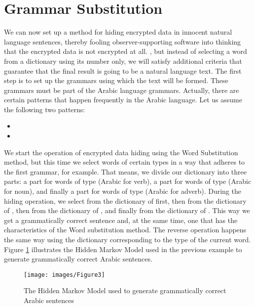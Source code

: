 \documentclass{acm_proc_article-sp}
\begin{document}
\section{Grammar Substitution}\label{Grammar-Substitution}
We can now set up a method for hiding encrypted data in innocent natural language sentences, thereby fooling observer-supporting software into thinking that the encrypted data is not encrypted at all.
, but instead of selecting a word from a dictionary using its number only, we will satisfy additional criteria that guarantee that the final result is going to be a natural language text. The first step is to set up the grammars using which the text will be formed. These grammars must be part of the Arabic language grammars. Actually, there are certain patterns that happen frequently in the Arabic language. Let us assume the following two patterns:
\begin{itemize}
    \item {}
    \item {}
\end{itemize}
We start the operation of encrypted data hiding using the Word Substitution method, but this time we select words of certain types in a way that adheres to the first grammar, for example. That means, we divide our dictionary into three parts: a part for words of type  (Arabic for verb), a part for words of type  (Arabic for noun), and finally a part for words of type  (Arabic for adverb). During the hiding operation, we select from the dictionary of  first, then from the dictionary of , then from the dictionary of , and finally from the dictionary of . This way we get a grammatically correct sentence and, at the same time, one that has the characteristics of the Word substitution method. The reverse operation happens the same way using the dictionary corresponding to the type of the current word. Figure \ref{The-Hidden-Markov-Model-used} illustrates the Hidden Markov Model used in the previous example to generate grammatically correct Arabic sentences.

\begin{figure}
  \centering
  \texttt{[image: images/Figure3]}
  \caption{The Hidden Markov Model used to generate grammatically correct Arabic sentences}\label{The-Hidden-Markov-Model-used}
\end{figure}
\end{document}
